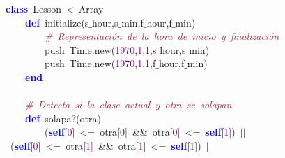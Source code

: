 \noindent
\mbox{}\textbf{\textcolor{Blue}{class}}\ Lesson\ \textcolor{BrickRed}{\textless{}}\ Array \\
\mbox{}\ \ \ \ \textbf{\textcolor{Blue}{def}}\ initialize\textcolor{BrickRed}{(}s$\_$hour\textcolor{BrickRed}{,}s$\_$min\textcolor{BrickRed}{,}f$\_$hour\textcolor{BrickRed}{,}f$\_$min\textcolor{BrickRed}{)} \\
\mbox{}\ \ \ \ \ \ \ \ \textit{\textcolor{Brown}{\#\ Representación\ de\ la\ hora\ de\ inicio\ y\ finalización}} \\
\mbox{}\ \ \ \ \ \ \ \ push\ Time\textcolor{BrickRed}{.}new\textcolor{BrickRed}{(}\textcolor{Purple}{1970}\textcolor{BrickRed}{,}\textcolor{Purple}{1}\textcolor{BrickRed}{,}\textcolor{Purple}{1}\textcolor{BrickRed}{,}s$\_$hour\textcolor{BrickRed}{,}s$\_$min\textcolor{BrickRed}{)} \\
\mbox{}\ \ \ \ \ \ \ \ push\ Time\textcolor{BrickRed}{.}new\textcolor{BrickRed}{(}\textcolor{Purple}{1970}\textcolor{BrickRed}{,}\textcolor{Purple}{1}\textcolor{BrickRed}{,}\textcolor{Purple}{1}\textcolor{BrickRed}{,}f$\_$hour\textcolor{BrickRed}{,}f$\_$min\textcolor{BrickRed}{)} \\
\mbox{}\ \ \ \ \textbf{\textcolor{Blue}{end}} \\
\mbox{}\ \ \ \  \\
\mbox{}\ \ \ \ \textit{\textcolor{Brown}{\#\ Detecta\ si\ la\ clase\ actual\ y\ otra\ se\ solapan}} \\
\mbox{}\ \ \ \ \textbf{\textcolor{Blue}{def}}\ solapa?\textcolor{BrickRed}{(}otra\textcolor{BrickRed}{)} \\
\mbox{}\ \ \ \ \ \ \ \ \textcolor{BrickRed}{(}\textbf{\textcolor{Blue}{self}}\textcolor{BrickRed}{[}\textcolor{Purple}{0}\textcolor{BrickRed}{]}\ \textcolor{BrickRed}{\textless{}=}\ otra\textcolor{BrickRed}{[}\textcolor{Purple}{0}\textcolor{BrickRed}{]}\ \textcolor{BrickRed}{\&\&}\ otra\textcolor{BrickRed}{[}\textcolor{Purple}{0}\textcolor{BrickRed}{]}\ \textcolor{BrickRed}{\textless{}=}\ \textbf{\textcolor{Blue}{self}}\textcolor{BrickRed}{[}\textcolor{Purple}{1}\textcolor{BrickRed}{])}\ \textcolor{BrickRed}{$|$$|$}\ \textcolor{BrickRed}{(}\textbf{\textcolor{Blue}{self}}\textcolor{BrickRed}{[}\textcolor{Purple}{0}\textcolor{BrickRed}{]}\ \textcolor{BrickRed}{\textless{}=}\ otra\textcolor{BrickRed}{[}\textcolor{Purple}{1}\textcolor{BrickRed}{]}\ \textcolor{BrickRed}{\&\&}\ otra\textcolor{BrickRed}{[}\textcolor{Purple}{1}\textcolor{BrickRed}{]}\ \textcolor{BrickRed}{\textless{}=}\ \textbf{\textcolor{Blue}{self}}\textcolor{BrickRed}{[}\textcolor{Purple}{1}\textcolor{BrickRed}{])}\ \textcolor{BrickRed}{$|$$|$} \\
